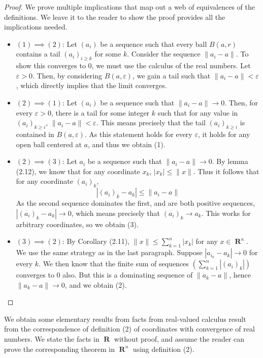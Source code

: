 \documentclass{report}
\DeclareMathOperator{\real}{\mathbf{R}}
\begin{document}
\begin{proof} We prove multiple implications that map out a web of equivalences of the definitions. We leave it to the reader to show the proof provides all the implications needed.

  \begin{itemize}
  \item $(1) \implies (2)$: Let $(a_i)$ be a sequence such that every ball $B(a,r)$ contains a tail $(a_i)_{i \geq k}$ for some $k$. Consider the sequence $\| a_i - a\|$. To show this converges to 0, we must use the calculus of the real numbers. Let $\varepsilon > 0$. Then, by considering $B(a,\varepsilon)$, we gain a tail such that $\| a_i - a \| < \varepsilon$, which directly implies that the limit converges.

  \item $(2) \implies (1)$: Let $(a_i)$ be a sequence such that $\| a_i - a \| \to 0$. Then, for every $\varepsilon > 0$, there is a tail for some integer $k$ such that for any value in $(a_i)_{k \geq i}$, $\| a_i - a \| < \varepsilon$. This means precisely that the tail $(a_i)_{k \geq i}$ is contained in $B(a,\varepsilon)$. As this statement holds for every $\varepsilon$, it holds for any open ball centered at $a$, and thus we obtain (1).

  \item $(2) \implies (3)$: Let $a_i$ be a sequence such that $\| a_i - a \| \to 0$. By lemma (2.12), we know that for any coordinate $x_k$, $|x_k| \leq \| x \|$. Thus it follows that for any coordinate $(a_i)_k$,
  \[ | (a_i)_k - a_k | \leq \| a_i - a \| \]
  As the second sequence dominates the first, and are both positive sequences, $|(a_i)_k - a_k| \to 0$, which means precisely that $(a_i)_k \to a_k$. This works for arbitrary coordinates, so we obtain (3).

  \item $(3) \implies (2)$: By Corollary (2.11), $\| x \| \leq \sum_{k = 1}^n |x_k|$ for any $x \in \real^n$. We use the same strategy as in the last paragraph. Suppose $|a_{i_k} - a_k| \to 0$ for every $k$. We then know that the finite sum of sequences $(\sum_{k = 1}^n |(a_i)_k|)$ converges to 0 also. But this is a dominating sequence of $\| a_k - a \|$, hence $\| a_k - a \| \to 0$, and we obtain (2).
  \end{itemize}
\end{proof}

We obtain some elementary results from facts from real-valued calculus result from the correspondence of definition (2) of coordinates with convergence of real numbers. We state the facts in $\real$ without proof, and assume the reader can prove the corresponding theorem in $\real^n$ using definition (2).
\end{document}
